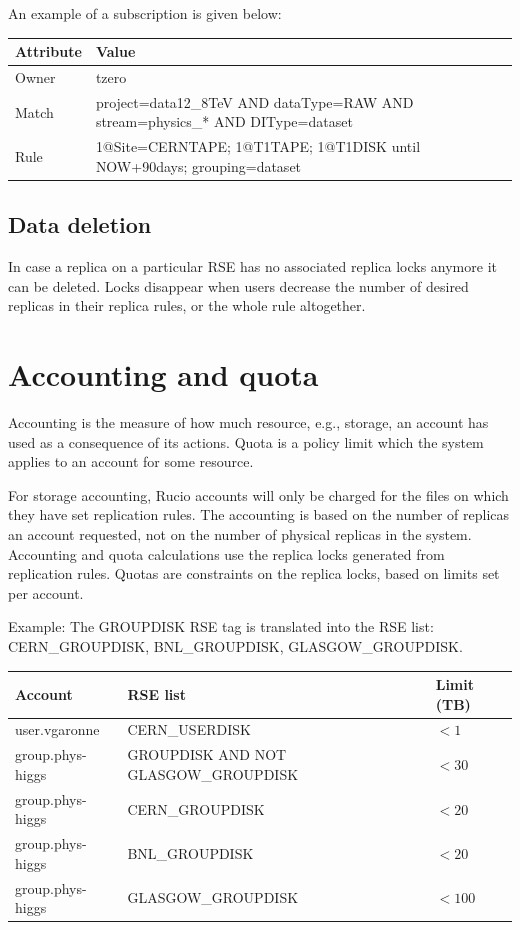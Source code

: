 \documentclass{atlasnote}
\begin{document}
An example of a subscription is given below:

\medskip

\begin{tabular}{l p{13cm}}
  \textbf{Attribute} & \textbf{Value} \\\hline
  Owner & tzero \\\hline
  Match & project=data12\_8TeV AND dataType=RAW AND stream=physics\_* AND DIType=dataset \\\hline
  Rule & 1@Site=CERNTAPE; 1@T1TAPE; 1@T1DISK until NOW+90days; grouping=dataset \\\hline
\end{tabular}

\subsection{Data deletion}
\label{sec:Datadeletion}

In case a replica on a particular RSE has no associated replica locks anymore it can be deleted.
Locks disappear when users decrease the number of desired replicas in their replica rules, or the whole rule altogether.

\section{Accounting and quota}
\label{overview_Accounting_and_quota:accounting-and-quota}\label{overview_Accounting_and_quota::doc}

Accounting is the measure of how much resource, e.g., storage, an account has used as a consequence of its actions. Quota is a policy limit which the system applies to an account for some resource.

For storage accounting, Rucio accounts will only be charged for the files on which they have set replication rules. The accounting is based on the number of replicas an account requested, not on the number of physical replicas in the system. Accounting and quota calculations use the replica locks generated from replication rules. Quotas are constraints on the replica locks, based on limits set per account.

Example: The GROUPDISK RSE tag is translated into the RSE list: CERN\_GROUPDISK, BNL\_GROUPDISK, GLASGOW\_GROUPDISK.

\medskip

\begin{tabular}{l p{9cm} p{2cm}}
  \textbf{Account} & \textbf{RSE list} & \textbf{Limit (TB)} \\\hline
  user.vgaronne     & CERN\_USERDISK  & $< 1$ \\\hline
  group.phys-higgs  & GROUPDISK AND NOT GLASGOW\_GROUPDISK  & $< 30$ \\\hline
  group.phys-higgs  & CERN\_GROUPDISK  & $< 20$ \\\hline
  group.phys-higgs  & BNL\_GROUPDISK  & $< 20$ \\\hline
  group.phys-higgs  & GLASGOW\_GROUPDISK  & $< 100$ \\\hline
\end{tabular}
\end{document}
